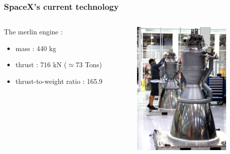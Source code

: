 {
    \logo{}

\begin{frame}
    \frametitle{SpaceX's current technology}
    \begin{columns}
        \begin{column}{60mm}
            The merlin engine :\\
            \vspace{1em}
            \begin{itemize}
                \item mass : 440 kg
                \item thrust : 716 kN ($\simeq$73 Tons)
                \item thrust-to-weight ratio : 165.9
            \end{itemize}
        \end{column}
        \begin{column}{45mm}
\includegraphics[width=48mm]{images/shiny_merlin}
        \end{column}
    \end{columns}
\end{frame}

}
